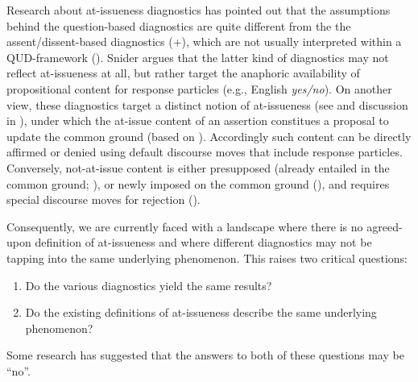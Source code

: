 \documentclass[times,linguex,xcolor]{glossa}
\begin{document}
  Research about at-issueness diagnostics has pointed out that the assumptions behind the question-based diagnostics are quite different from the the assent/dissent-based diagnostics (+), which are not usually interpreted within a QUD-framework (\citealt{snider_anaphoric_2017,snider_at-issuenessne_2017,snider_distinguishing_2018,koev_notions_2018,faller_discourse_2019,korotkova_evidential_2020}).
  Snider argues that the latter kind of diagnostics may not reflect at-issueness at all, but rather target the anaphoric availability of propositional content for response particles (e.g., English \emph{yes/no}).
  On another view, these diagnostics target a distinct notion of at-issueness (see \citealt{koev_notions_2018} and discussion in \citealt{faller_discourse_2019,korotkova_evidential_2020}), under which the at-issue content of an assertion constitues a proposal to update the common ground (based on \citealt{farkas_reacting_2010}). Accordingly such content can be directly affirmed or denied using default discourse moves that include response particles. Conversely, not-at-issue content is either presupposed (already entailed in the common ground; \citealt{stalnaker_presuppositions_1973,stalnaker_common_2002}), or newly imposed on the common ground (\citealt{murray_varieties_2014,anderbois_at-issue_2015}), and requires special discourse moves for rejection (\citealt{potts_logic_2005}).

  Consequently, we are currently faced with a landscape where there is no agreed-upon definition of at-issueness and where different diagnostics may not be tapping into the same underlying phenomenon. This raises two critical questions:

  \begin{enumerate}
    \item Do the various diagnostics yield the same results?
    \item Do the existing definitions of at-issueness describe the same underlying phenomenon?
  \end{enumerate}

  \noindent Some research has suggested that the answers to both of these questions may be ``no''.
\end{document}
